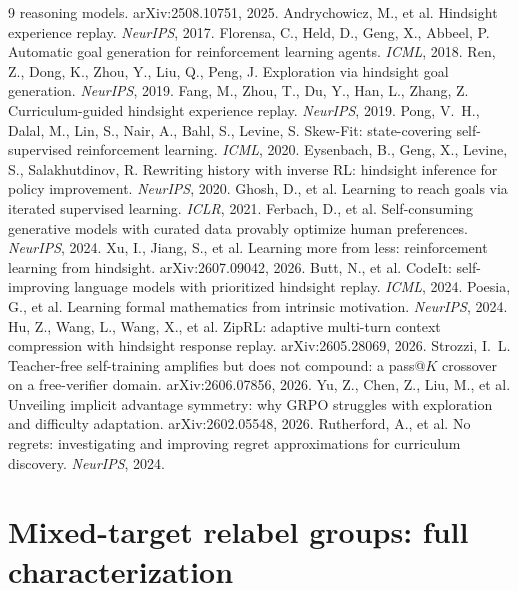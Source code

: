 \begin{thebibliography}{9}
reasoning models. arXiv:2508.10751, 2025.
 Andrychowicz, M., et al.
Hindsight experience replay. \emph{NeurIPS}, 2017.
 Florensa, C., Held, D., Geng,
X., Abbeel, P. Automatic goal generation for reinforcement learning
agents. \emph{ICML}, 2018.
 Ren, Z., Dong, K., Zhou, Y., Liu, Q.,
Peng, J. Exploration via hindsight goal generation. \emph{NeurIPS},
2019.
 Fang, M., Zhou, T., Du, Y., Han, L.,
Zhang, Z. Curriculum-guided hindsight experience replay.
\emph{NeurIPS}, 2019.
 Pong, V.~H., Dalal, M., Lin, S.,
Nair, A., Bahl, S., Levine, S. Skew-Fit: state-covering self-supervised
reinforcement learning. \emph{ICML}, 2020.
 Eysenbach, B., Geng, X.,
Levine, S., Salakhutdinov, R. Rewriting history with inverse RL:
hindsight inference for policy improvement. \emph{NeurIPS}, 2020.
 Ghosh, D., et al. Learning to reach
goals via iterated supervised learning. \emph{ICLR}, 2021.
 Ferbach, D., et al. Self-consuming
generative models with curated data provably optimize human preferences.
\emph{NeurIPS}, 2024.
 Xu, I., Jiang, S., et al. Learning more
from less: reinforcement learning from hindsight. arXiv:2607.09042, 2026.
 Butt, N., et al. CodeIt:
self-improving language models with prioritized hindsight replay.
\emph{ICML}, 2024.
 Poesia, G., et al. Learning formal
mathematics from intrinsic motivation. \emph{NeurIPS}, 2024.
 Hu, Z., Wang, L., Wang, X., et al.
ZipRL: adaptive multi-turn context compression with hindsight response
replay. arXiv:2605.28069, 2026.
 Strozzi, I.~L. Teacher-free
self-training amplifies but does not compound: a pass@$K$ crossover on a
free-verifier domain. arXiv:2606.07856, 2026.
 Yu, Z., Chen, Z., Liu, M., et al.
Unveiling implicit advantage symmetry: why GRPO struggles with
exploration and difficulty adaptation. arXiv:2602.05548, 2026.
 Rutherford, A., et al. No
regrets: investigating and improving regret approximations for curriculum
discovery. \emph{NeurIPS}, 2024.
\end{thebibliography}

\appendix
\section{Mixed-target relabel groups: full characterization}
\label{app:mixed}

